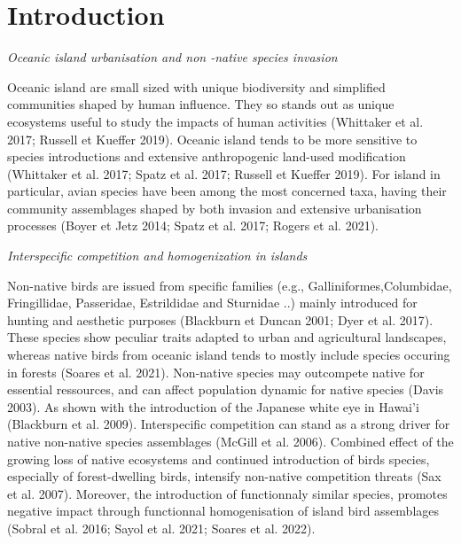 \documentclass[
  french,
  11pt,
]{stylisharticle}
\affiliation{%
      \textsuperscript{1}%
      Université de Montpellier%
      , Scientific Department%
      , Somewhere%
      , Montpellier%
      , France%
      , 9999%
    }
\begin{document}
\flushbottom

\maketitle

\tableofcontents

\thispagestyle{empty}

\section{Introduction}\label{introduction}

\emph{Oceanic island urbanisation and non -native species invasion}

Oceanic island are small sized with unique biodiversity and simplified
communities shaped by human influence. They so stands out as unique
ecosystems useful to study the impacts of human activities (Whittaker et
al. 2017; Russell et Kueffer 2019). Oceanic island tends to be more
sensitive to species introductions and extensive anthropogenic land-used
modification (Whittaker et al. 2017; Spatz et al. 2017; Russell et
Kueffer 2019). For island in particular, avian species have been among
the most concerned taxa, having their community assemblages shaped by
both invasion and extensive urbanisation processes (Boyer et Jetz 2014;
Spatz et al. 2017; Rogers et al. 2021).

\emph{Interspecific competition and homogenization in islands}

Non-native birds are issued from specific families (e.g.,
Galliniformes,Columbidae, Fringillidae, Passeridae, Estrildidae and
Sturnidae ..) mainly introduced for hunting and aesthetic purposes
(Blackburn et Duncan 2001; Dyer et al. 2017). These species show
peculiar traits adapted to urban and agricultural landscapes, whereas
native birds from oceanic island tends to mostly include species
occuring in forests (Soares et al. 2021). Non-native species may
outcompete native for essential ressources, and can affect population
dynamic for native species (Davis 2003). As shown with the introduction
of the Japanese white eye in Hawai'i (Blackburn et al. 2009).
Interspecific competition can stand as a strong driver for native
non-native species assemblages (McGill et al. 2006). Combined effect of
the growing loss of native ecosystems and continued introduction of
birds species, especially of forest-dwelling birds, intensify non-native
competition threats (Sax et al. 2007). Moreover, the introduction of
functionnaly similar species, promotes negative impact through
functionnal homogenisation of island bird assemblages (Sobral et al.
2016; Sayol et al. 2021; Soares et al. 2022).
\end{document}
